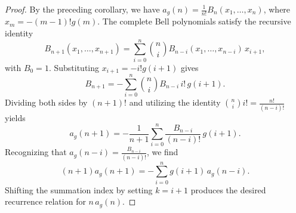 \documentclass[10pt,a4paper]{amsart}
\begin{document}
\begin{proof}
By the preceding corollary, we have \( a_g(n) = \frac{1}{n!} B_n(x_1,\dots,x_n) \), where \(x_m=-(m-1)!g(m)\). The complete Bell polynomials satisfy the recursive identity\
\[
B_{n+1}(x_1,\dots,x_{n+1})
=
\sum_{i=0}^{n}
\binom{n}{i}
B_{n-i}(x_1,\dots,x_{n-i})\,x_{i+1},
\]
with \(B_0=1\). Substituting \(x_{i+1}=-i!g(i+1)\) gives
\[
B_{n+1}
=
-\sum_{i=0}^{n}
\binom{n}{i}
B_{n-i}\, i!\, g(i+1).
\]
Dividing both sides by \((n+1)!\) and utilizing the identity \(\binom{n}{i}i! = \frac{n!}{(n-i)!}\) yields
\[
a_g(n+1)
=
-\frac1{n+1}
\sum_{i=0}^{n}
\frac{B_{n-i}}{(n-i)!}\,
g(i+1).
\]
Recognizing that \(a_g(n-i)=\frac{B_{n-i}}{(n-i)!}\), we find
\[
(n+1)a_g(n+1)
=
-\sum_{i=0}^{n}
g(i+1)\,a_g(n-i).
\]
Shifting the summation index by setting \(k = i+1\) produces the desired recurrence relation for \(n\,a_g(n)\).
\end{proof}
\end{document}
